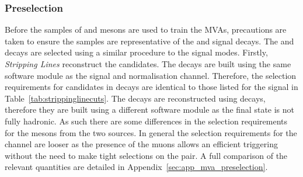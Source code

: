 \subsubsection{Preselection}

Before the samples of \Dsp and \phiz mesons are used to train the MVAs, precautions are taken to ensure the samples are representative of the \decay{\Bp}{\Dsp\phiz} and \decay{\Bp}{\Dsp\Kp\Km} signal decays. The \decay{\Bsb}{\Dsp\pim} and \decay{\Bs}{\jpsi\phiz} decays are selected using a similar procedure to the signal modes. Firstly, \emph{Stripping Lines} reconstruct the candidates. The \decay{\Bsb}{\Dsp\pim} decays are built using the same software module as the signal and normalisation channel. Therefore, the selection requirements for \Dsp candidates in \decay{\Bsb}{\Dsp\pim} decays are identical to those listed for the signal in Table~\ref{tab:strippinglinecuts}.
The \decay{\Bs}{\jpsi\phiz} decays are reconstructed using \decay{\jpsi}{\mup\mun} decays, therefore they are built using a different software module as the final state is not fully hadronic. As such there are some differences in the selection requirements for the \phiz mesons from the two sources. In general the selection requirements for the \decay{\Bs}{\jpsi\phiz} channel are looser as the presence of the muons allows an efficient triggering without the need to make tight selections on the \Kp\Km pair. 
A full comparison of the relevant quantities are detailed in Appendix~\ref{sec:app_mva_preselection}.




